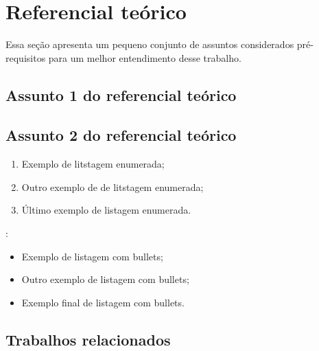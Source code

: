 \chapter{Referencial teórico}
\label{cap:referencial_teorico}

Essa seção apresenta um pequeno conjunto de assuntos considerados pré-requisitos para um melhor entendimento desse trabalho.

\lipsum[22]

\section{Assunto 1 do referencial teórico} \label{sub:assunto2}

\lipsum[23-27]

\section{Assunto 2 do referencial teórico}

\lipsum[23-27]

\begin{enumerate}
    \item Exemplo de litstagem enumerada;
    \item Outro exemplo de de litstagem enumerada;
    \item Último exemplo de listagem enumerada.
\end{enumerate}

\lipsum[28]:

\begin{itemize}
    \item Exemplo de listagem com bullets;
    \item Outro exemplo de listagem com bullets; 
    \item Exemplo final de listagem com bullets. 
\end{itemize}

\section{Trabalhos relacionados}

\lipsum[23-27]